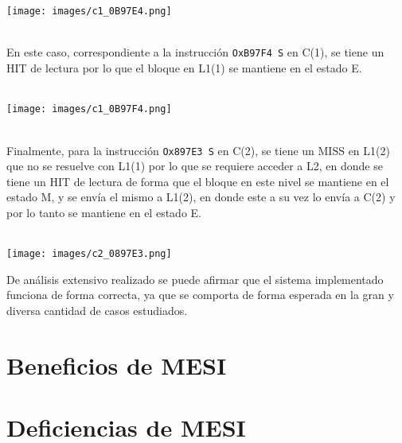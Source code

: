 \documentclass {article}
\begin{document}
\\
\\
\begin{centering} \texttt{[image: images/c1\_0B97E4.png]} \end{centering}
\\
En este caso, correspondiente a la instrucción \texttt{OxB97F4 S} en C(1), se tiene un HIT de
lectura por lo que el bloque en L1(1) se mantiene en el estado E.
\\
\\
\begin{centering} \texttt{[image: images/c1\_0B97F4.png]} \end{centering}
\\
Finalmente, para la instrucción \texttt{Ox897E3 S} en C(2), se tiene un MISS en L1(2) que no se
resuelve con L1(1) por lo que se requiere acceder a L2, en donde se tiene un HIT de lectura de forma
que el bloque en este nivel se mantiene en el estado M, y se envía el mismo a L1(2), en donde este a
su vez lo envía a C(2) y por lo tanto se mantiene en el estado E.
\\
\\
\begin{centering} \texttt{[image: images/c2\_0897E3.png]} \end{centering}


De análisis extensivo realizado se puede afirmar que el sistema implementado funciona de forma
correcta, ya que se comporta de forma esperada en la gran y diversa cantidad de casos estudiados.

\section{Beneficios de MESI}

\section{Deficiencias de MESI}
\end{document}
